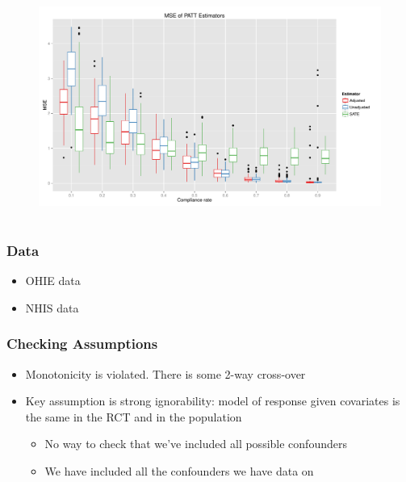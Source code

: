 \documentclass{beamer}
\begin{document}
\begin{frame}
\begin{figure}[htbp]
\centering
   \includegraphics[width=\linewidth]{../paper/mse_boxplots_B5.pdf} 
\label{simulation-plot}
\end{figure}
\end{frame}



\section[Data]{}

\begin{frame}
\frametitle{Data}
\begin{itemize}
\item OHIE data
\item NHIS data
\end{itemize}
\end{frame}


\begin{frame}
\frametitle{Checking Assumptions}
\begin{itemize}
\item Monotonicity is violated. There is some 2-way cross-over
\item Key assumption is strong ignorability: model of response given covariates is the same in the RCT and in the population
\begin{itemize}
\item No way to check that we've included all possible confounders
\item We have included all the confounders we have data on
\end{itemize}
\end{itemize}
\end{frame}
\end{document}
